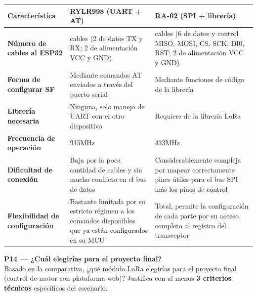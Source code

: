 \documentclass[11pt, letterpaper]{article}
\newenvironment{pregunta}[1]{%
  \begin{mdframed}[backgroundcolor=purpleLight, linecolor=purpleMain, linewidth=1pt,
    innerleftmargin=12pt, innerrightmargin=12pt,
    innertopmargin=8pt,  innerbottommargin=8pt]
  \textbf{\color{purpleMain}#1}\\[6pt]
}{\end{mdframed}\vspace{0.2cm}}
\begin{document}
\begin{table}[H]
  \centering
  \begin{tabular}{>{\bfseries}p{3.5cm}
                  >{\centering\arraybackslash}p{4.5cm}
                  >{\centering\arraybackslash}p{4.5cm}}
    \toprule
    \textbf{Caracter\'istica} &
    \textbf{RYLR998 (UART + AT)} &
    \textbf{RA-02 (SPI + librer\'ia)} \\
    \midrule
    N\'umero de cables al ESP32 &
    4 cables (2 de datos TX y RX; 2 de alimentaci\'on VCC y GND)&
    8 cables (6 de datos y control MISO, MOSI, CS, SCK, DI0, RST; 2 de alimentaci\'on VCC y GND)\\[1.2em]

    Forma de configurar SF &
    Mediante comandos AT enviados a través del puerto serial&
    Mediante funciones de código de la librería\\[1.2em]

    Librer\'ia necesaria &
    Ninguna, solo manejo de UART con el otro dispositivo&
    Requiere de la librer\'ia LoRa\\[1.2em]

    Frecuencia de operaci\'on &
    915MHz&
    433MHz\\[1.2em]

    Dificultad de conexi\'on &
    Baja por la poca cantidad de cables y sin mucho conflicto en el bus de datos&
    Considerablemente compleja por mapear correctamente pines \'utiles para el bus SPI más los pines de control\\[1.2em]

    Flexibilidad de configuraci\'on &
    Bastante limitada por su estricto r\'egimen a los comandos disponibles que ya est\'an configurados en su MCU&
    Total, permite la configuraci\'on de cada parte por su acceso completo al registro del transceptor\\[1.2em]
    \bottomrule
  \end{tabular}
\end{table}

\begin{pregunta}{P14 --- ¿Cuál elegirías para el proyecto final?}
  Basado en la comparativa, ¿qu\'e m\'odulo LoRa elegir\'ias para el proyecto final
  (control de motor con plataforma web)? Justifica con al menos \textbf{3 criterios
  t\'ecnicos} espec\'ificos del escenario.
\end{pregunta}
\end{document}
